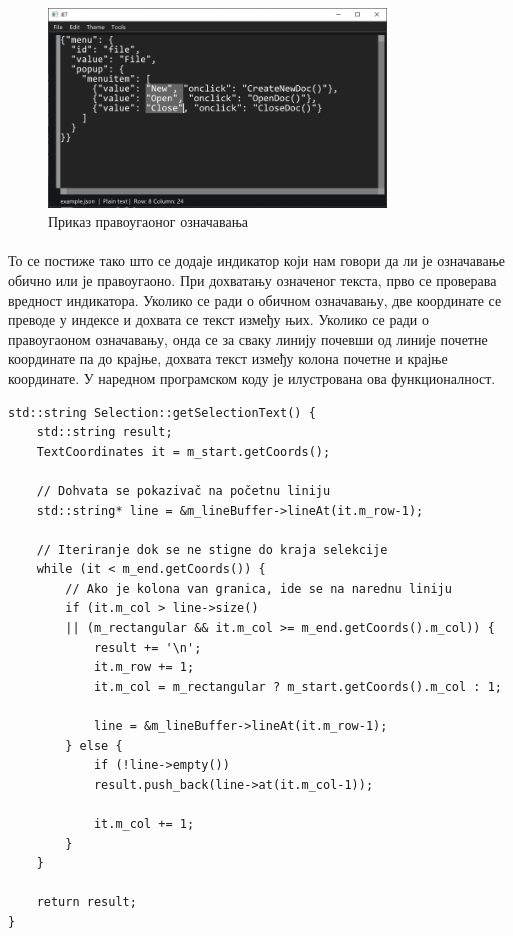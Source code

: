 \documentclass[12pt,oneside]{memoir}
\begin{document}
\begin{figure}[!ht]
	\centering
	\includegraphics[width=0.8\textwidth]{images/rectangular_selection.png}
	\caption{Приказ правоугаоног означавања}
	\label{fig:rectangular_selection}
\end{figure}

\paragraph{}
То се постиже тако што се додаје индикатор који нам говори да ли
је означавање обично или је правоугаоно. При дохватању означеног
текста, прво се проверава вредност индикатора. Уколико се ради о обичном
означавању, две координате се преводе у индексе и дохвата се текст између
њих. Уколико се ради о правоугаоном означавању, онда се за сваку линију
почевши од линије почетне координате па до крајње, дохвата текст између колона
почетне и крајње координате. У наредном програмском коду је илустрована ова
функционалност.

\begin{verbatim}
std::string Selection::getSelectionText() {
	std::string result;
	TextCoordinates it = m_start.getCoords();
	
	// Dohvata se pokazivač na početnu liniju
	std::string* line = &m_lineBuffer->lineAt(it.m_row-1);
	
	// Iteriranje dok se ne stigne do kraja selekcije
	while (it < m_end.getCoords()) {
		// Ako je kolona van granica, ide se na narednu liniju
		if (it.m_col > line->size() 
		|| (m_rectangular && it.m_col >= m_end.getCoords().m_col)) {
			result += '\n';
			it.m_row += 1;
			it.m_col = m_rectangular ? m_start.getCoords().m_col : 1;
			
			line = &m_lineBuffer->lineAt(it.m_row-1);
		} else {
			if (!line->empty())
			result.push_back(line->at(it.m_col-1));
			
			it.m_col += 1;
		}
	}
	
	return result;
}
\end{verbatim}
\end{document}

